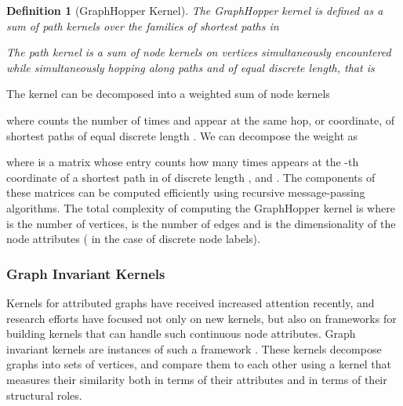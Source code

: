 \documentclass[twoside,11pt]{article}
\newtheorem{definition}{Definition}
\begin{document}
\begin{definition}[GraphHopper Kernel]
  The GraphHopper kernel is defined as a sum of path kernels  over the families  of shortest
  paths in 
  
  The path kernel  is a sum of node kernels  on vertices simultaneously encountered while simultaneously hopping along paths  and  of equal discrete length, that is
  
\end{definition}

The  kernel can be decomposed into a weighted sum of node kernels

where  counts the number of times  and  appear at the same hop, or coordinate,  of shortest paths  of equal discrete length .
We can decompose the weight  as

where  is a  matrix whose entry  counts how many times  appears at the -th coordinate of a shortest path in  of discrete length , and .
The components of these matrices can be computed efficiently using recursive message-passing algorithms. 
The total complexity of computing the GraphHopper kernel is  where  is the number of vertices,  is the number of edges and  is the dimensionality of the node attributes ( in the case of discrete node labels).


\subsubsection{Graph Invariant Kernels}
Kernels for attributed graphs have received increased attention recently, and research efforts have focused not only on new kernels, but also on frameworks for building kernels that can handle such continuous node attributes.
Graph invariant kernels are instances of such a framework .
These kernels decompose graphs into sets of vertices, and compare them to each other using a kernel that measures their similarity both in terms of their attributes and in terms of their structural roles.
\end{document}
